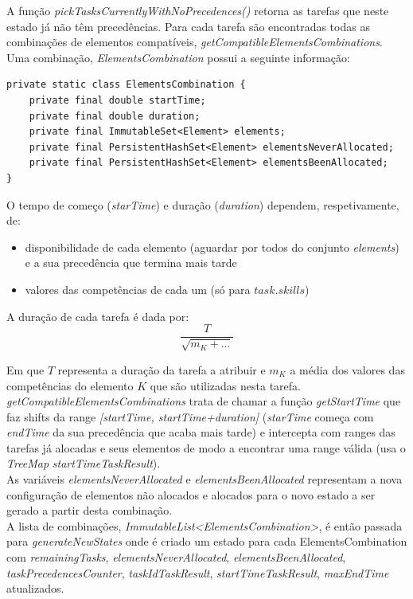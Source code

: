 \documentclass[a4paper,11pt]{article}
\begin{document}
A função \textit{pickTasksCurrentlyWithNoPrecedences()} retorna as tarefas que neste estado já não têm precedências. Para cada tarefa são encontradas todas as combinações de elementos compatíveis, \textit{getCompatibleElementsCombinations}. Uma combinação, \textit{ElementsCombination} possui a seguinte informação:\newpage

\begin{verbatim}
private static class ElementsCombination {
	private final double startTime;
	private final double duration;
	private final ImmutableSet<Element> elements;
	private final PersistentHashSet<Element> elementsNeverAllocated;
	private final PersistentHashSet<Element> elementsBeenAllocated;
}
\end{verbatim}

O tempo de começo (\textit{starTime}) e duração (\textit{duration}) dependem, respetivamente, de:
\begin{itemize}
	\item disponibilidade de cada elemento (aguardar por todos do conjunto \textit{elements}) e a sua precedência que termina mais tarde
	\item valores das competências de cada um (só para $task.skills$)
\end{itemize}

A duração de cada tarefa é dada por:
\[
\frac{T}{\sqrt{m_K + ...}}
\]

Em que $T$ representa a duração da tarefa a atribuir e $m_K$ a média dos valores das competências do elemento $K$ que são utilizadas nesta tarefa.\\

\textit{getCompatibleElementsCombinations} trata de chamar a função \textit{getStartTime} que faz shifts da range \textit{[startTime, startTime+duration]} (\textit{starTime} começa com \textit{endTime} da sua precedência que acaba mais tarde) e intercepta com ranges das tarefas já alocadas e seus elementos de modo a encontrar uma range válida (usa o \textit{TreeMap} \textit{startTimeTaskResult}).\\
 
As variáveis \textit{elementsNeverAllocated} e \textit{elementsBeenAllocated} representam a nova configuração de elementos não alocados e alocados para o novo estado a ser gerado a partir desta combinação.\\

A lista de combinações, \textit{ImmutableList<ElementsCombination>}, é então passada para \textit{generateNewStates} onde é criado um estado para cada ElementsCombination com \textit{remainingTasks}, \textit{elementsNeverAllocated}, \textit{elementsBeenAllocated}, \textit{taskPrecedencesCounter}, \textit{taskIdTaskResult}, \textit{startTimeTaskResult}, \textit{maxEndTime} atualizados.
\end{document}
